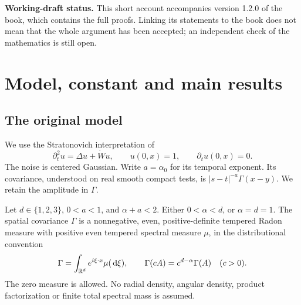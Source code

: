 \begin{abstract}
  This reading edition explains how fast the second moment grows and what
  determines its limiting constant. We follow the argument from construction of
  the solution to an independent upper bound at the correct time scale, and
  then to identification of the constant. The spatial covariance is a
  nonnegative positive-definite homogeneous Radon measure in dimensions one,
  two or three. The temporal covariance is a fractional power. The limiting
  constant is a supremum over all nonnegative smooth compact spacetime controls,
  with the original covariance amplitude and gradient coefficient one. The
  Gaussian cost is half the variance of the associated Gaussian functional.
  We give the definitions, main statements and connecting deductions, with
  links to the full proofs in the book. The book also contains the finite-order
  calculations and alternative estimates.
\end{abstract}
\noindent\textbf{Working-draft status.} This short account accompanies
version 1.2.0 of the book, which contains the full proofs. Linking its
statements to the book does not mean that the whole argument has been accepted;
an independent check of the mathematics is still open.
\tableofcontents



\section{Model, constant and main results}\label{S:reader-model}
\subsection{The original model}

We use the Stratonovich interpretation of
\begin{equation}\label{E:reader-model}
  \partial_t^2u=\Delta u+\dot{W} u,\qquad
  u(0,x)=1,\qquad \partial_tu(0,x)=0.
\end{equation}
The noise is centered Gaussian. Write $a = \alpha_0$ for its temporal exponent.
Its covariance, understood on real smooth compact tests, is
$|s-t|^{-a}\Gamma(x-y)$. We retain the amplitude in $\Gamma$.

\begin{hypothesis}\label{H:reader-model}
  Let $d \in \{1,2,3\}$, $0 < a < 1$, and $\alpha+a < 2$. Either $0 < \alpha <
  d$, or $\alpha = d = 1$. The spatial covariance $\Gamma$ is a nonnegative,
  even, positive-definite tempered Radon measure with positive even tempered
  spectral measure $\mu$, in the distributional convention
  \[
    \Gamma=\int_{\mathbb R^d}e^{i\xi\cdot x}\mu(\,\mathrm d\xi),\qquad
    \Gamma(cA)=c^{d-\alpha}\Gamma(A)\quad(c>0).
  \]
  The zero measure is allowed. No radial density, angular density, product
  factorization or finite total spectral mass is assumed.
\end{hypothesis}

